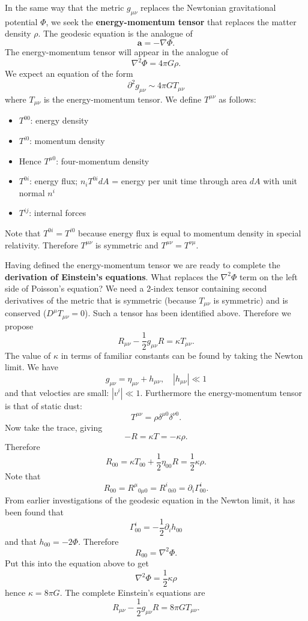 \documentclass[11pt]{article}
\begin{document}
In the same way that the metric $g_{\mu \nu}$ replaces the Newtonian gravitational potential $\Phi$, we seek the \textbf{energy-momentum tensor} that replaces the matter density $\rho$.
The geodesic equation is the analogue of
$$ \boldsymbol{a} = - \nabla \Phi. $$
The energy-momentum tensor will appear in the analogue of
$$ \nabla^2 \Phi = 4 \pi G \rho. $$
We expect an equation of the form
$$ \partial^2 g_{\mu \nu} \sim 4 \pi G T_{\mu \nu} $$
where $T_{\mu \nu}$ is the energy-momentum tensor.
We define $T^{\mu \nu}$ as follows:
\begin{itemize}
\item $T^{00}$: energy density
\item $T^{i0}$: momentum density 
\item Hence $T^{\mu 0}$: four-momentum density
\item $T^{0i}$: energy flux; $n_i T^{0i} dA$ = energy per unit time  through area $dA$ with unit normal $n^i$
\item $T^{ij}$: internal forces
\end{itemize}
Note that $T^{0i} = T^{i0}$ because energy flux is equal to momentum density in special relativity.
Therefore $T^{\mu \nu}$ is symmetric and $T^{\mu \nu} = T^{\nu \mu}$.

Having defined the energy-momentum tensor we are ready to complete the \textbf{derivation of Einstein's equations}.
What replaces the $\nabla^2 \Phi$ term on the left side of Poisson's equation?
We need a 2-index tensor containing second derivatives of the metric that is symmetric (because $T_{\mu \nu}$ is symmetric) and is conserved ($D^\mu T_{\mu \nu} = 0$).
Such a tensor has been identified above.
Therefore we propose
$$ R_{\mu \nu} -\frac{1}{2} g_{\mu \nu} R = \kappa T_{\mu \nu}. $$
The value of $\kappa$ in terms of familiar constants can be found by taking the Newton limit.
We have
$$ g_{\mu \nu} = \eta_{\mu \nu} + h_{\mu \nu}, \quad \left| h_{\mu \nu} \right| \ll 1 $$
and that velocties are small: $|v^i| \ll 1$.
Furthermore the energy-momentum tensor is that of static dust:
$$ T^{\mu \nu} = \rho \delta^{\mu 0} \delta^{\nu 0}. $$
Now take the trace, giving
$$ -R = \kappa T = -\kappa \rho. $$
Therefore
$$ R_{00} = \kappa T_{00} + \frac{1}{2} \eta_{00} R = \frac{1}{2} \kappa \rho. $$
Note that
$$ R_{00} = R^\mu{}_{0 \mu 0} = R^i{}_{0 i 0} = \partial_i  \Gamma^i_{00}. $$
From earlier investigations of the geodesic equation in the Newton limit, it has been found that
$$ \Gamma^i_{00} = -\frac{1}{2} \partial_i h_{00} $$
and that $h_{00} = -2\Phi$. Therefore
$$ R_{00} = \nabla^2 \Phi. $$
Put this into the equation above to get
$$ \nabla^2 \Phi = \frac{1}{2} \kappa \rho $$
hence $\kappa = 8\pi G$.
The complete Einstein's equations are
$$ R_{\mu \nu} - \frac{1}{2} g_{\mu \nu} R = 8\pi G T_{\mu \nu}. $$
\end{document}
